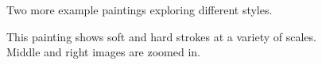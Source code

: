 \documentclass[conference]{acmsiggraph}
\begin{document}
\begin{figure}
    \centering
		\hspace*{0.5in}
    \caption{Two more example paintings exploring different styles.}
    \label{fig:apple-eye}
\end{figure}

\begin{figure}
    \centering
    \caption{This painting shows soft and hard strokes at a variety of scales.  Middle and right images are zoomed in.}
    \label{fig:stop}
\end{figure}
\end{document}
